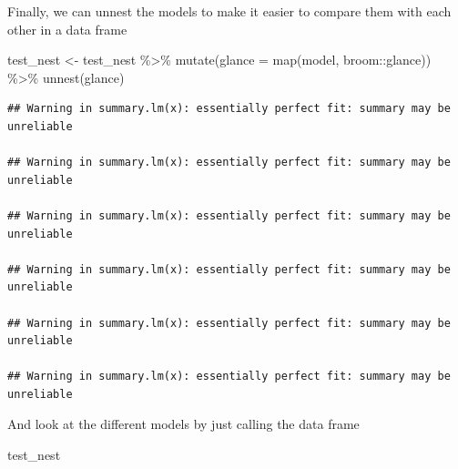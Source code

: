\documentclass[
]{book}
\newenvironment{Shaded}{\begin{snugshade}}{\end{snugshade}}
\newcommand{\AttributeTok}[1]{\textcolor[rgb]{0.77,0.63,0.00}{#1}}
\newcommand{\FunctionTok}[1]{\textcolor[rgb]{0.00,0.00,0.00}{#1}}
\newcommand{\NormalTok}[1]{#1}
\newcommand{\OtherTok}[1]{\textcolor[rgb]{0.56,0.35,0.01}{#1}}
\newcommand{\SpecialCharTok}[1]{\textcolor[rgb]{0.00,0.00,0.00}{#1}}
\begin{document}
Finally, we can unnest the models to make it easier to compare them with each other in a data frame

\begin{Shaded}
\begin{Highlighting}[]
\NormalTok{test\_nest }\OtherTok{\textless{}{-}}\NormalTok{ test\_nest }\SpecialCharTok{\%\textgreater{}\%} 
  \FunctionTok{mutate}\NormalTok{(}\AttributeTok{glance =} \FunctionTok{map}\NormalTok{(model, broom}\SpecialCharTok{::}\NormalTok{glance)) }\SpecialCharTok{\%\textgreater{}\%} 
  \FunctionTok{unnest}\NormalTok{(glance)}
\end{Highlighting}
\end{Shaded}

\begin{verbatim}
## Warning in summary.lm(x): essentially perfect fit: summary may be unreliable

## Warning in summary.lm(x): essentially perfect fit: summary may be unreliable

## Warning in summary.lm(x): essentially perfect fit: summary may be unreliable

## Warning in summary.lm(x): essentially perfect fit: summary may be unreliable

## Warning in summary.lm(x): essentially perfect fit: summary may be unreliable

## Warning in summary.lm(x): essentially perfect fit: summary may be unreliable
\end{verbatim}

And look at the different models by just calling the data frame

\begin{Shaded}
\begin{Highlighting}[]
\NormalTok{test\_nest}
\end{Highlighting}
\end{Shaded}
\end{document}
